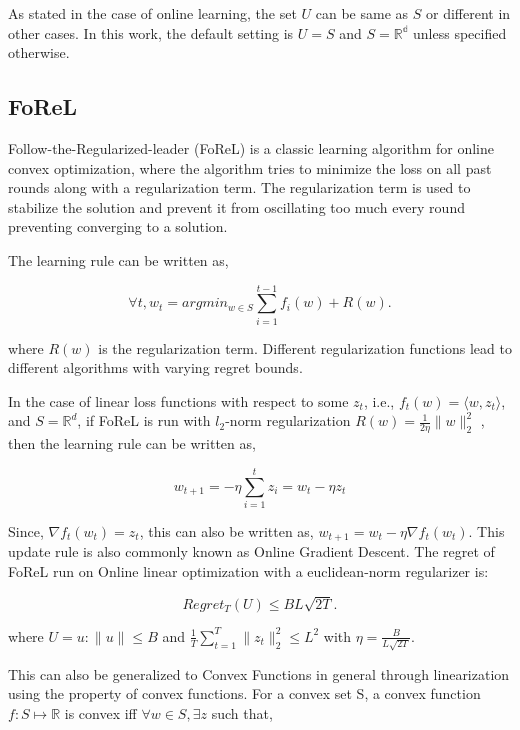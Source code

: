 As stated in the case of online learning, the set $U$ can be same as $S$ or different in other cases. In this work, the default setting is $U=S$ and 
$S=\mathbb{R^d}$ unless specified otherwise.


\subsection{FoReL}

Follow-the-Regularized-leader (FoReL) is a classic learning algorithm for online convex optimization, where the algorithm tries to minimize the loss on 
all past rounds along with a regularization term. The regularization term is used to stabilize the solution and prevent it from oscillating too much every 
round preventing converging to a solution.

The learning rule can be written as,

$$\forall t, w_t = argmin_{w \in S} \sum_{i=1}^{t-1} f_i(w) + R(w).$$

where $R(w)$ is the regularization term. Different regularization functions lead to different algorithms with varying regret bounds.


In the case of linear loss functions with respect to some $z_t$, i.e., $f_t(w) = \langle w, z_t \rangle$, and $S=\mathbb{R}^d$,  if FoReL is run with 
$l_2$-norm regularization $R(w) = \frac{1}{2 \eta} \|w\|_2^2$ , then the learning rule can be written as,

\begin{equation}
    w_{t+1} = -\eta \sum_{i=1}^t z_i = w_t - \eta z_t
\end{equation}

Since, $\nabla f_t(w_t) = z_t$, this can also be written as, $w_{t+1} = w_t - \eta \nabla f_t(w_t)$. This update rule is also commonly known as Online Gradient Descent.
The regret of FoReL run on Online linear optimization with a euclidean-norm regularizer is:

$$Regret_T(U) \leq BL \sqrt {2T}.$$

where $U = {u : \|u\| \leq B}$ and $\frac{1}{T} \sum_{t=1}^T \|z_t\|_2^2 \leq L^2$ with $\eta = \frac{B}{L\sqrt{2T}}$.

This can also be generalized to Convex Functions in general through linearization using the property of convex functions. For a convex set S, a convex function $f: S \mapsto \mathbb{R}$ is convex iff $\forall w \in S, \exists z$ such that,

